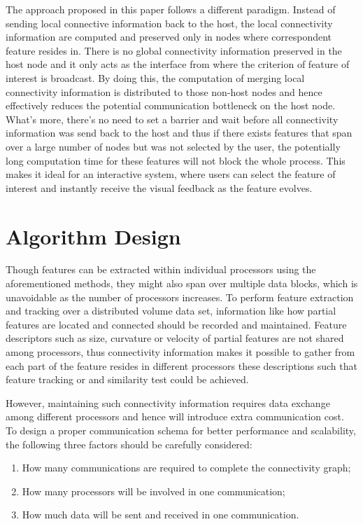 \documentclass[10pt, conference, compsocconf]{IEEEtran}
\begin{document}
The approach proposed in this paper follows a different paradigm. Instead of sending local connective information back to the host, the local connectivity information are computed and preserved only in nodes where correspondent feature resides in. There is no global connectivity information preserved in the host node and it only acts as the interface from where the criterion of feature of interest is broadcast. By doing this, the computation of merging local connectivity information is distributed to those non-host nodes and hence effectively reduces the potential communication bottleneck on the host node. What's more, there's no need to set a barrier and wait before all connectivity information was send back to the host and thus if there exists features that span over a large number of nodes but was not selected by the user, the potentially long computation time for these features will not block the whole process. This makes it ideal for an interactive system, where users can select the feature of interest and instantly receive the visual feedback as the feature evolves.

\section{Algorithm Design}
Though features can be extracted within individual processors using the aforementioned methods, they might also span over multiple data blocks, which is unavoidable as the number of processors increases. To perform feature extraction and tracking over a distributed volume data set, information like how partial features are located and connected should be recorded and maintained. Feature descriptors such as size, curvature or velocity of partial features are not shared among processors, thus connectivity information makes it possible to gather from each part of the feature resides in different processors these descriptions such that feature tracking or and similarity test could be achieved. 

However, maintaining such connectivity information requires data exchange among different processors and hence will introduce extra communication cost. To design a proper communication schema for better performance and scalability, the following three factors should be carefully considered:

\begin{enumerate}
\item How many communications are required to complete the connectivity graph;
\item How many processors will be involved in one communication;
\item How much data will be sent and received in one communication.
\end{enumerate}
\end{document}
